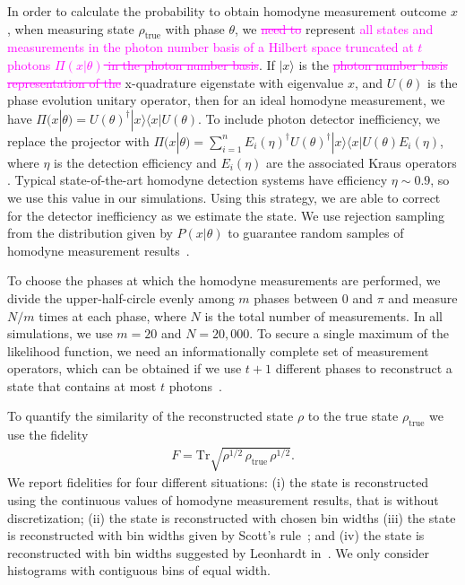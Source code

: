 \documentclass[
reprint,
superscriptaddress,
showpacs,
amsmath,
amssymb,
aps,
pra,
longbibliography
]{revtex4-1}
\providecommand{\aucmnt}[1]{#1}
\providecommand{\editcolor}[2]{\textcolor{#1}{#2}}
\providecommand{\aucmnt}[1]{}
\providecommand{\editcolor}[2]{#2}
\newcommand{\SG}[1]{\editcolor{magenta}{#1}}
\newcommand{\SGs}[1]{\aucmnt{\editcolor{magenta}{\sout{#1}}}}
\newcommand{\rhotrue}{\rho_{\text{true}}}
\begin{document}
In order to calculate the probability to obtain homodyne measurement
outcome $x$, when measuring state $\rho_{\mathrm{true}}$ with phase
$\theta$, we \SGs{need to} represent \SG{all states and measurements
  in the photon number basis of a Hilbert space truncated at $t$
  photons} \SGs{$\Pi (x|\theta)$ in the photon number basis}. If
$|x\rangle$ is the \SGs{photon number basis representation of the}
x-quadrature eigenstate with eigenvalue $x$, and $U(\theta)$ is the
phase evolution unitary operator, then for an ideal homodyne
measurement, we have $\Pi(x|\theta) = U(\theta)^{\dagger} |x\rangle
\langle x| U(\theta)$. To include photon detector inefficiency, we
replace the projector with $\Pi(x|\theta) = \sum_{i=1}^{n}
E_i(\eta)^{\dagger} U(\theta)^{\dagger} |x\rangle \langle x| U(\theta)
E_i(\eta)$, where $\eta$ is the detection efficiency and $E_i(\eta)$
are the associated Kraus operators \cite{Lvovsky2004}.  Typical
state-of-the-art homodyne detection systems have efficiency $\eta \sim
0.9$, so we use this value in our simulations. Using this strategy, we
are able to correct for the detector inefficiency as we estimate the
state. We use rejection sampling from the distribution given by
$P(x|\theta)$ to guarantee random samples of homodyne measurement
results~\cite{Kennedy1980}.

To choose the phases at which the homodyne measurements are performed,
we divide the upper-half-circle evenly among $m$ phases between 0 and
$\pi$ and measure $N/m$ times at each phase, where $N$ is the total
number of measurements. In all simulations, we use $m=20$ and
$N = 20,000$. To secure a single maximum of the likelihood function,
we need an informationally complete set of measurement operators,
which can be obtained if we use $t+1$ different phases to reconstruct
a state that contains at most $t$ photons~\cite{Leonhardt1997}.

To quantify the similarity of the reconstructed state $\rho$ to the
true state $\rhotrue$ we use the fidelity
\begin{eqnarray}
  F = \mathrm{Tr} \sqrt{\rho^{1/2}\, \rhotrue \, \rho^{1/2}}.
\end{eqnarray}
We report fidelities for four different
situations: (i) the state is reconstructed using the continuous values
of homodyne measurement results, that is without discretization; (ii)
the state is reconstructed with chosen bin widths (iii) the state is
reconstructed with bin widths given by Scott's rule~\cite{Scott2010};
and (iv) the state is reconstructed with bin widths suggested by
Leonhardt in~\cite{Leonhardt1997}. We only consider histograms with
contiguous bins of equal width.
\end{document}
